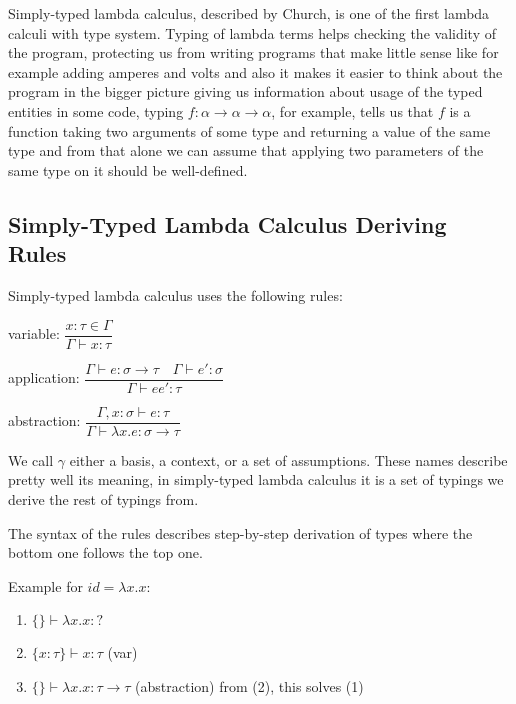 Simply-typed lambda calculus, described by Church, is one of the first %
lambda calculi with type system. Typing of lambda terms helps checking the validity of the program, protecting us from writing
programs that make little sense like for example adding amperes and volts %
and also it makes it easier to think about the program in the bigger picture giving us information about usage of the typed entities
in some code, typing $f : \alpha \rightarrow \alpha \rightarrow \alpha$, for example, tells us that $f$ is a function taking two arguments
of some type and returning a value of the same type and from that alone we can assume that applying two parameters of the same type on it
should be well-defined.


\subsection{Simply-Typed Lambda Calculus Deriving Rules}

Simply-typed lambda calculus uses the following rules:


variable:
$\dfrac{x : \tau \in \Gamma}{\Gamma \vdash x : \tau}$

application:
$\dfrac{\Gamma \vdash e : \sigma \rightarrow \tau \quad \Gamma \vdash e' : \sigma}{\Gamma \vdash e e' : \tau}$

abstraction:
$\dfrac{\Gamma, x : \sigma \vdash e : \tau}{\Gamma \vdash \lambda x . e : \sigma \rightarrow \tau}$

We call $\gamma$ either a basis, a context, or a set of assumptions. These names describe pretty well its meaning, in simply-typed lambda calculus it
is a set of typings we derive the rest of typings from.

The syntax of the rules describes step-by-step derivation of types where the bottom one follows the top one.

Example for $id = \lambda x . x$:

\begin{enumerate}
    \item $\{\} \vdash \lambda x . x : ?$
    \item $\{x : \tau\} \vdash x : \tau$ (var)
    \item $\{\} \vdash \lambda x . x : \tau \rightarrow \tau$ (abstraction) from (2), this solves (1)
\end{enumerate}

